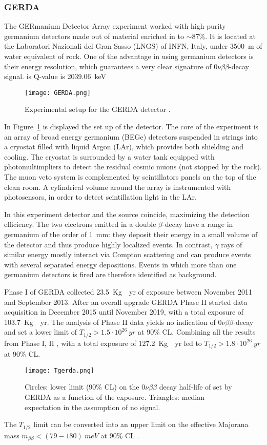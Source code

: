 \documentclass{subnucbo}
\begin{document}
\subsubsection{GERDA}
The GERmanium Detector Array experiment worked with high-purity germanium detectors made out of material enriched in  to $\sim87\%$. It is located at the Laboratori Nazionali del Gran Sasso (LNGS) of INFN, Italy,  under \SI{3500}{m} of water equivalent of rock.
One of the advantage in using germanium detectors is their energy resolution, which guarantees a very clear signature of $0\nu\beta\beta$-decay signal. is Q-value is \SI{2039.06}{keV}
\begin{figure}
\centering
\texttt{[image: GERDA.png]}
\caption{Experimental setup for the GERDA detector \cite{ref:gerLay}.}
\label{fig:GerLayout}
\end{figure}
In Figure~\ref{fig:GerLayout} is displayed the set up of the detector. The core of the experiment is an array of broad energy germanium (BEGe) detectors suspended in strings into a cryostat filled with liquid Argon (LAr), which provides both shielding and cooling.
The cryostat is surrounded by a water tank equipped with photomultimpliers to detect the residual cosmic muons (not stopped by the rock). The muon veto system is complemented by scintillators panels on the top of the clean room.
A cylindrical volume around the array is instrumented with photosensors, in order to detect scintillation light in the LAr.

In this experiment detector and the source coincide, maximizing the detection efficiency.
The two electrons emitted in a double $\beta$-decay have a range in germanium of the order of \SI{1}{mm}: they deposit their energy in a small volume of the detector and thus produce highly localized events. In contrast, $\gamma$ rays of similar energy mostly interact via Compton scattering and can produce events with several separated energy depositions. Events in which more than one germanium detectors is fired are therefore identified as background.

Phase I of GERDA collected \SI{23.5}{Kg\cdot yr} of exposure between November 2011 and September 2013. After an overall upgrade GERDA Phase II started data acquisition in December 2015 until November 2019, with a total exposure of \SI{103.7}{Kg\cdot yr}.
The analysis of Phase II data yields no indication of $0\nu\beta\beta$-decay and set a lower limit of $T_{1/2}>1.5\cdot10^{26}\SI{}{yr}$ at 90\% CL. Combining all the results from Phase I, II , with a total exposure of \SI{127.2}{Kg\cdot yr} led to $T_{1/2}>1.8\cdot10^{26}\SI{}{yr}$ at 90\% CL.
\begin{figure}
\centering
\texttt{[image: Tgerda.png]}
\caption{Circles: lower limit (90\% CL) on the $0\nu\beta\beta$ decay half-life of  set by GERDA as a function of the exposure. Triangles: median expectation in the assumption of no signal. \cite{ref:gerda}}
\label{fig:Tgerda}
\end{figure}
The $T_{1/2}$ limit can be converted into an upper limit on the effective Majorana mass $m_{\beta\beta}<(79-180)\SI{}{meV}$ at 90\% CL \cite{ref:gerda}.
\end{document}
